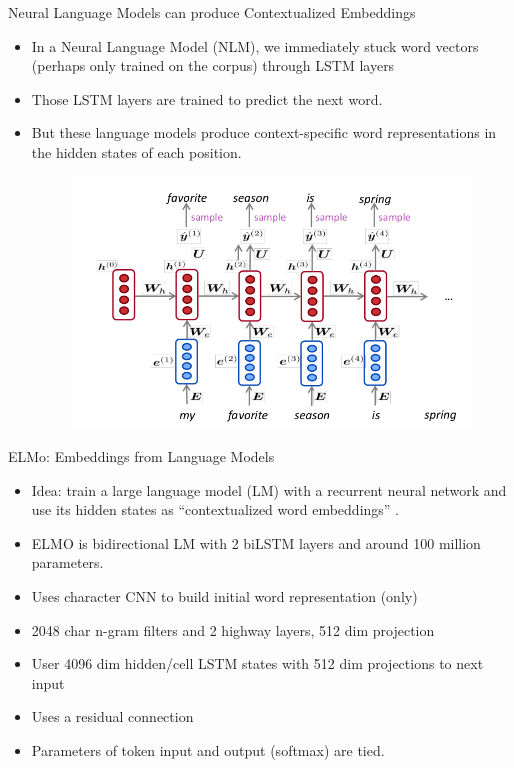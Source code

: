 \documentclass[handout]{beamer}
\begin{document}
\begin{frame}{Neural Language Models can produce Contextualized Embeddings}
\begin{scriptsize}
\begin{itemize}
\item In a Neural Language Model (NLM), we immediately stuck word vectors (perhaps only trained on the corpus) through LSTM layers
\item  Those LSTM layers are trained to predict the next word.
\item  But these language models produce context-specific word representations in the hidden states of each position.

    \begin{figure}[h]
        	\includegraphics[scale = 0.4]{pics/lstm_nlm.png}
        \end{figure}  


\end{itemize}
\end{scriptsize}
\end{frame}




\begin{frame}{ELMo: Embeddings from Language Models}
\begin{scriptsize}
\begin{itemize}
\item Idea: train a large language model (LM)  with a recurrent neural network and use its hidden states as ``contextualized word embeddings'' 
\cite{peters-etal-2018-deep}. 

\item ELMO is bidirectional LM with 2 biLSTM layers and around 100 million parameters.
\item  Uses character CNN to build initial word representation (only)
\item  2048 char n-gram filters and 2 highway layers, 512 dim projection
\item  User 4096 dim hidden/cell LSTM states with 512 dim projections to next input
\item  Uses a residual connection
\item  Parameters of token input and output (softmax) are tied.


 

\end{itemize}
\end{scriptsize}
\end{frame}
\end{document}
